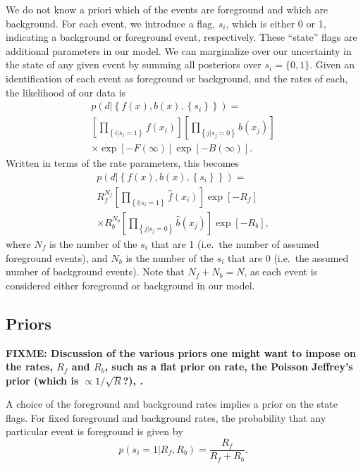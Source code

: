 \documentclass[aps,prd,reprint]{revtex4-1}
\newcommand{\fixme}[1]{\textbf{FIXME: #1}}
\begin{document}
We do not know a priori which of the events are foreground and which
are background.  For each event, we introduce a flag, $s_i$, which is
either 0 or 1, indicating a background or foreground event,
respectively.  These ``state'' flags are additional parameters in our
model.  We can marginalize over our uncertainty in the state of any
given event by summing all posteriors over $s_i = \{0,1\}$.  Given an
identification of each event as foreground or background, and the
rates of each, the likelihood of our data is
\begin{multline}
  p\left( d | \left\{ f(x), b(x), \left\{ s_i \right\} \right\}
  \right) = \\ \left[ \prod_{\left\{ i | s_i = 1 \right\}} f\left( x_i
    \right) \right]  \left[ \prod_{\left\{ j | s_j = 0 \right\}}
    b\left( x_j \right) \right] \\
  \times \exp\left[ - F\left( \infty \right) \right] 
  \exp\left[ -B\left( \infty \right) \right].
\end{multline}
Written in terms of the rate parameters, this becomes
\begin{multline}
  p\left( d | \left\{ f(x), b(x), \left\{ s_i \right\} \right\}
  \right) = \\ R_f^{N_f} \left[ \prod_{\left\{ i | s_i = 1 \right\}}
    \hat{f}\left( x_i \right) \right] \exp\left[ - R_f \right] \\
  \times R_b^{N_b} \left[ \prod_{\left\{ j | s_j = 0 \right\}}
    \hat{b}\left( x_j \right) \right] \exp\left[ - R_b \right],
\end{multline}
where $N_f$ is the number of the $s_i$ that are 1 (i.e.\ the number of
assumed foreground events), and $N_b$ is the number of the $s_i$ that
are 0 (i.e.\ the assumed number of background events).  Note that $N_f
+ N_b = N$, as each event is considered either foreground or
background in our model.

\subsection{Priors}

\fixme{Discussion of the various priors one might want to impose on
  the rates, $R_f$ and $R_b$, such as a flat prior on rate, the
  Poisson Jeffrey's prior (which is $\propto 1/\sqrt{R}$?), .}

A choice of the foreground and background rates implies a prior on the
state flags.  For fixed foreground and background rates, the
probability that any particular event is foreground is given by 
\begin{equation}
  p\left(s_i = 1 | R_f, R_b \right) = \frac{R_f}{R_f + R_b}.
\end{equation}
\end{document}
